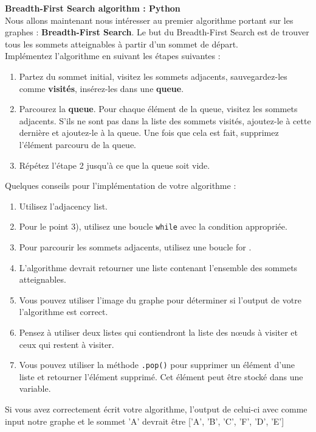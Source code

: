 \begin{Exercice}[20 minutes]  \textbf{Breadth-First Search algorithm : Python}\\
    Nous allons maintenant nous intéresser au premier algorithme portant sur les graphes : \textbf{Breadth-First Search}. Le but du Breadth-First Search est de trouver tous les sommets atteignables à partir d'un sommet de départ.\\
    Implémentez l'algorithme en suivant les étapes suivantes :\\
    \begin{enumerate}
    
    \item Partez du sommet initial, visitez les sommets adjacents, sauvegardez-les comme \textbf{visités}, insérez-les dans une \textbf{queue}.
    
    \item Parcourez la \textbf{queue}. Pour chaque élément de la queue, visitez les sommets adjacents. S'ils ne sont pas dans la liste des sommets visités, ajoutez-le à cette dernière et ajoutez-le à la queue. Une fois que cela est fait, supprimez l'élément parcouru de la queue.
    
    \item Répétez l'étape 2 jusqu'à ce que la queue soit vide.\\

    \end{enumerate}

    \begin{conseil}
        Quelques conseils pour l'implémentation de votre algorithme :
        \begin{enumerate}
            \item Utilisez l'adjacency list.
            \item Pour le point 3), utilisez une boucle \lstinline{while} avec la condition appropriée.
            \item Pour parcourir les sommets adjacents, utilisez une boucle for .
            \item L'algorithme devrait retourner une liste contenant l'ensemble des sommets atteignables.
            \item Vous pouvez utiliser l'image du graphe pour déterminer si l'output de votre l'algorithme est correct.
            \item Pensez à utiliser deux listes qui contiendront la liste des nœuds à visiter et ceux qui restent à visiter.
            \item Vous pouvez utiliser la méthode \lstinline{.pop()} pour supprimer un élément d'une liste et retourner l'élément supprimé. Cet élément peut être stocké dans une variable.
        \end{enumerate}
    \end{conseil}
    \begin{solution}
        
        Si vous avez correctement écrit votre algorithme, l'output de celui-ci avec comme input notre graphe et le sommet 'A' devrait être ['A', 'B', 'C', 'F', 'D', 'E']
    \end{solution}
\end{Exercice}



